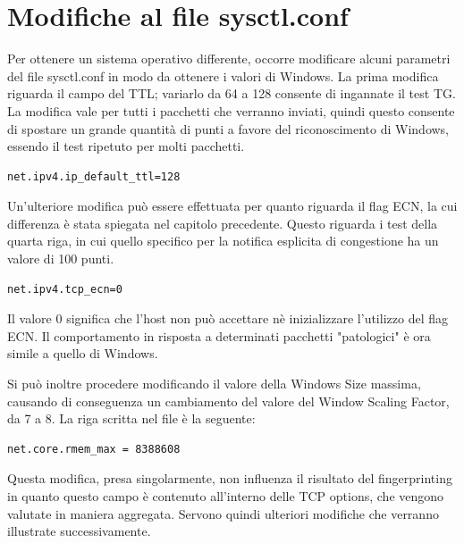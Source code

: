 \section{Modifiche al file sysctl.conf}
Per ottenere un sistema operativo differente, occorre modificare alcuni parametri del file sysctl.conf in modo da ottenere i valori di Windows.
La prima modifica riguarda il campo del TTL; variarlo da 64 a 128 consente di ingannate il test TG. La modifica vale per tutti i pacchetti che verranno inviati, quindi questo consente di spostare un grande quantità di punti a favore del riconoscimento di Windows, essendo il test ripetuto per molti pacchetti.

\begin{lstlisting}[caption={Modifica al campo TTL nel file sysctl.conf}]
	net.ipv4.ip_default_ttl=128
\end{lstlisting}

Un'ulteriore modifica può essere effettuata per quanto riguarda il flag ECN, la cui differenza è stata spiegata nel capitolo precedente. Questo riguarda i test della quarta riga, in cui quello specifico per la notifica esplicita di congestione ha un valore di 100 punti.

\begin{lstlisting}[caption={Modifica al campo ECN nel file sysctl.conf}]
	net.ipv4.tcp_ecn=0
\end{lstlisting} 

Il valore 0 significa che l'host non può accettare nè inizializzare l'utilizzo del flag ECN. Il comportamento in risposta a determinati pacchetti "patologici" è ora simile a quello di Windows.

Si può inoltre procedere modificando il valore della Windows Size massima, causando di conseguenza un cambiamento del valore del Window Scaling Factor, da 7 a 8. 
La riga scritta nel file è la seguente:

\begin{lstlisting}[caption={Modifica alla Windows Size massima nel file sysctl.conf}]
	net.core.rmem_max = 8388608
\end{lstlisting}

Questa modifica, presa singolarmente, non influenza il risultato del fingerprinting in quanto questo campo è contenuto all'interno delle TCP options, che vengono valutate in maniera aggregata. Servono quindi ulteriori modifiche che verranno illustrate successivamente.

